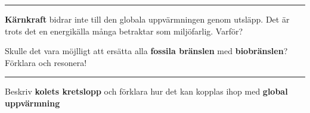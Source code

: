 \documentclass{exam}
\begin{document}
\begin{questions}
\vspace{60mm} 
\hrule 
\vspace{5mm}
\question 
\textbf{Kärnkraft} bidrar inte till den globala uppvärmningen genom utsläpp. Det är trots det en energikälla många betraktar som miljöfarlig. Varför?

\break
\vspace{5mm} %
\begin{center}
\end{center}
\vspace{5mm} %
\question 
Skulle det vara möjlligt att ersätta alla \textbf{fossila bränslen} med \textbf{biobränslen}? Förklara och resonera!

\vspace{90mm} 
\hrule 
\vspace{5mm}
\question 
Beskriv \textbf{kolets kretslopp }och förklara hur det kan kopplas ihop med \textbf{global uppvärmning}

\end{questions}
\end{document}
